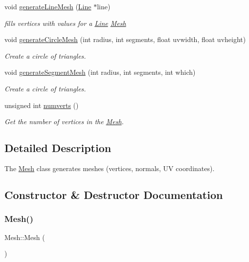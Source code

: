 \begin{DoxyCompactItemize}
void \hyperlink{class_mesh_ab8b53063bcbe830643a0cfae16479319}{generate\+Line\+Mesh} (\hyperlink{class_line}{Line} $\ast$line)
\begin{DoxyCompactList}\small\item\em fills vertices with values for a \hyperlink{class_line}{Line} \hyperlink{class_mesh}{Mesh} \end{DoxyCompactList}\item 
void \hyperlink{class_mesh_a06e38fa57785adc606830de291f3235e}{generate\+Circle\+Mesh} (int radius, int segments, float uvwidth, float uvheight)
\begin{DoxyCompactList}\small\item\em Create a circle of triangles. \end{DoxyCompactList}\item 
void \hyperlink{class_mesh_aec5d0429ff6899aabe39142d6bea5218}{generate\+Segment\+Mesh} (int radius, int segments, int which)
\begin{DoxyCompactList}\small\item\em Create a circle of triangles. \end{DoxyCompactList}\item 
unsigned int \hyperlink{class_mesh_a42d9946683e647e3a44df79e3d5cc11f}{numverts} ()
\begin{DoxyCompactList}\small\item\em Get the number of vertices in the \hyperlink{class_mesh}{Mesh}. \end{DoxyCompactList}\end{DoxyCompactItemize}


\subsection{Detailed Description}
The \hyperlink{class_mesh}{Mesh} class generates meshes (vertices, normals, UV coordinates). 

\subsection{Constructor \& Destructor Documentation}
\mbox{\label{class_mesh_a2af137f1571af89172b9c102302c416b}} 
\subsubsection{\texorpdfstring{Mesh()}{Mesh()}}
{\footnotesize\ttfamily Mesh\+::\+Mesh (\begin{DoxyParamCaption}{ }\end{DoxyParamCaption})}



